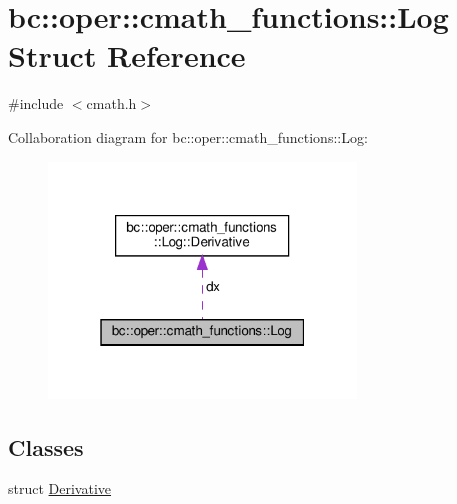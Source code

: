\hypertarget{structbc_1_1oper_1_1cmath__functions_1_1Log}{}\section{bc\+:\+:oper\+:\+:cmath\+\_\+functions\+:\+:Log Struct Reference}
\label{structbc_1_1oper_1_1cmath__functions_1_1Log}


{\ttfamily \#include $<$cmath.\+h$>$}



Collaboration diagram for bc\+:\+:oper\+:\+:cmath\+\_\+functions\+:\+:Log\+:\nopagebreak
\begin{figure}[H]
\begin{center}
\leavevmode
\includegraphics[width=232pt]{structbc_1_1oper_1_1cmath__functions_1_1Log__coll__graph}
\end{center}
\end{figure}
\subsection*{Classes}
\begin{DoxyCompactItemize}
\item 
struct \hyperlink{structbc_1_1oper_1_1cmath__functions_1_1Log_1_1Derivative}{Derivative}
\end{DoxyCompactItemize}

